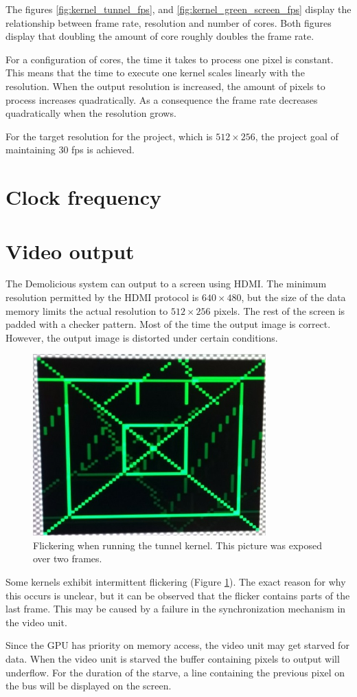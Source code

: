 \documentclass[../main/report.tex]{subfiles}
\begin{document}
The figures \ref{fig:kernel_tunnel_fps}, and \ref{fig:kernel_green_screen_fps} display the relationship between frame rate, resolution and number of cores.
Both figures display that doubling the amount of core roughly doubles the frame rate.

For a configuration of cores, the time it takes to process one pixel is constant.
This means that the time to execute one kernel scales linearly with the resolution.
When the output resolution is increased, the amount of pixels to process increases quadratically.
As a consequence the frame rate decreases quadratically when the resolution grows.
  
For the target resolution for the project, which is $512\times256$, the project goal of maintaining 30 fps is achieved.

\section{Clock frequency}

\section{Video output}
The Demolicious system can output to a screen using HDMI.
The minimum resolution permitted by the HDMI protocol is $640\times480$,
but the size of the data memory limits the actual resolution to $512\times256$ pixels.
The rest of the screen is padded with a checker pattern.
Most of the time the output image is correct.
However, the output image is distorted under certain conditions.
\begin{figure}[H]
	\centering
	\includegraphics[width=0.8\textwidth]{../results/diagrams/flicker.jpg}
	\caption{Flickering when running the tunnel kernel. This picture was exposed over two frames.}
	\label{fig:flickering}
\end{figure}
Some kernels exhibit intermittent flickering (Figure \ref{fig:flickering}).
The exact reason for why this occurs is unclear, but
it can be observed that the flicker contains parts of the last frame. 
This may be caused by a failure in the synchronization mechanism in the video unit.

Since the GPU has priority on memory access, the video unit may get starved for data.
When the video unit is starved the buffer containing pixels to output will underflow.
For the duration of the starve, a line containing the previous pixel on the bus will be displayed on the screen.
\end{document}
